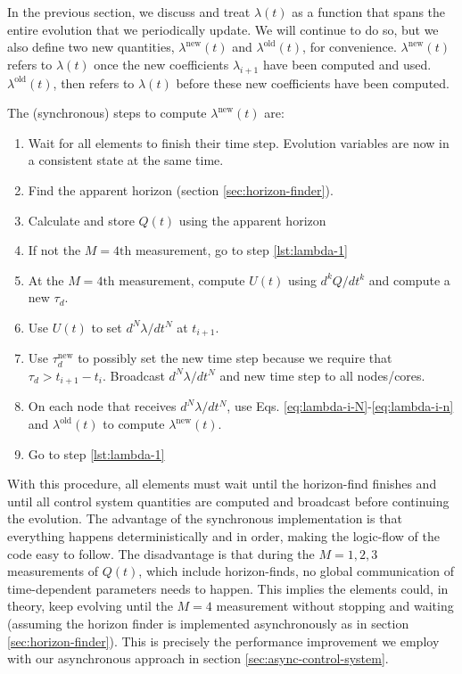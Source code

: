 \begin{bibunit}[unsrtnat]
In the previous section, we discuss and treat $\lambda(t)$ as a function that
spans the entire evolution that we periodically update. We will continue to do
so, but we also define two new quantities, $\lambda^\mathrm{new}(t)$ and
$\lambda^\mathrm{old}(t)$, for convenience. $\lambda^\mathrm{new}(t)$ refers to
$\lambda(t)$ once the new coefficients $\lambda_{i+1}$ have been computed and
used. $\lambda^\mathrm{old}(t)$, then refers to $\lambda(t)$ before these new
coefficients have been computed.

The (synchronous) steps to compute $\lambda^\mathrm{new}(t)$ are:

\begin{enumerate}
  \item \label{lst:lambda-1} Wait for all elements to finish their time step.
  Evolution variables are now in a consistent state at the same time.
  \item Find the apparent horizon (section \ref{sec:horizon-finder}).
  \item Calculate and store $Q(t)$ using the apparent horizon
  \item If not the $M=4\textrm{th}$ measurement, go to step \ref{lst:lambda-1}
  \item At the $M=4\textrm{th}$ measurement, compute $U(t)$ using
  $d^{k}Q/dt^{k}$ and compute a new $\tau_d$.
  \item Use $U(t)$ to set $d^{N}\lambda/dt^{N}$ at $t_{i+1}$.
  \item Use $\tau^\mathrm{new}_d$ to possibly set the new time step because we
  require that $\tau_d > t_{i+1} - t_i$. Broadcast $d^{N}\lambda/dt^{N}$ and new
  time step to all nodes/cores.
  \item On each node that receives $d^{N}\lambda/dt^{N}$, use Eqs.
  \eqref{eq:lambda-i-N}-\eqref{eq:lambda-i-n} and $\lambda^\mathrm{old}(t)$
  to compute $\lambda^\mathrm{new}(t)$.
  \item Go to step \ref{lst:lambda-1}
\end{enumerate}

With this procedure, all elements must wait until the horizon-find finishes and
until all control system quantities are computed and broadcast before continuing
the evolution. The advantage of the synchronous implementation is that
everything happens deterministically and in order, making the logic-flow of the
code easy to follow. The disadvantage is that during the $M=1,2,3$ measurements
of $Q(t)$, which include horizon-finds, no global communication of
time-dependent parameters needs to happen. This implies the elements could, in
theory, keep evolving until the $M=4$ measurement without stopping and waiting
(assuming the horizon finder is implemented asynchronously as in section
\ref{sec:horizon-finder}). This is precisely the performance improvement we
employ with our asynchronous approach in section \ref{sec:async-control-system}.


\end{bibunit}
